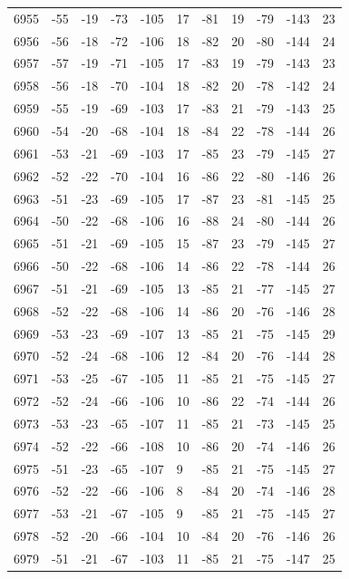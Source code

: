 \begin{table}[H]
\begin{tabular}{lllllllllll}
6955 & -55 & -19 & -73 & -105 & 17 & -81 & 19 & -79 & -143 & 23 \\
6956 & -56 & -18 & -72 & -106 & 18 & -82 & 20 & -80 & -144 & 24 \\
6957 & -57 & -19 & -71 & -105 & 17 & -83 & 19 & -79 & -143 & 23 \\
6958 & -56 & -18 & -70 & -104 & 18 & -82 & 20 & -78 & -142 & 24 \\
6959 & -55 & -19 & -69 & -103 & 17 & -83 & 21 & -79 & -143 & 25 \\
6960 & -54 & -20 & -68 & -104 & 18 & -84 & 22 & -78 & -144 & 26 \\
6961 & -53 & -21 & -69 & -103 & 17 & -85 & 23 & -79 & -145 & 27 \\
6962 & -52 & -22 & -70 & -104 & 16 & -86 & 22 & -80 & -146 & 26 \\
6963 & -51 & -23 & -69 & -105 & 17 & -87 & 23 & -81 & -145 & 25 \\
6964 & -50 & -22 & -68 & -106 & 16 & -88 & 24 & -80 & -144 & 26 \\
6965 & -51 & -21 & -69 & -105 & 15 & -87 & 23 & -79 & -145 & 27 \\
6966 & -50 & -22 & -68 & -106 & 14 & -86 & 22 & -78 & -144 & 26 \\
6967 & -51 & -21 & -69 & -105 & 13 & -85 & 21 & -77 & -145 & 27 \\
6968 & -52 & -22 & -68 & -106 & 14 & -86 & 20 & -76 & -146 & 28 \\
6969 & -53 & -23 & -69 & -107 & 13 & -85 & 21 & -75 & -145 & 29 \\
6970 & -52 & -24 & -68 & -106 & 12 & -84 & 20 & -76 & -144 & 28 \\
6971 & -53 & -25 & -67 & -105 & 11 & -85 & 21 & -75 & -145 & 27 \\
6972 & -52 & -24 & -66 & -106 & 10 & -86 & 22 & -74 & -144 & 26 \\
6973 & -53 & -23 & -65 & -107 & 11 & -85 & 21 & -73 & -145 & 25 \\
6974 & -52 & -22 & -66 & -108 & 10 & -86 & 20 & -74 & -146 & 26 \\
6975 & -51 & -23 & -65 & -107 & 9 & -85 & 21 & -75 & -145 & 27 \\
6976 & -52 & -22 & -66 & -106 & 8 & -84 & 20 & -74 & -146 & 28 \\
6977 & -53 & -21 & -67 & -105 & 9 & -85 & 21 & -75 & -145 & 27 \\
6978 & -52 & -20 & -66 & -104 & 10 & -84 & 20 & -76 & -146 & 26 \\
6979 & -51 & -21 & -67 & -103 & 11 & -85 & 21 & -75 & -147 & 25 \\

\end{tabular}
\end{table}
